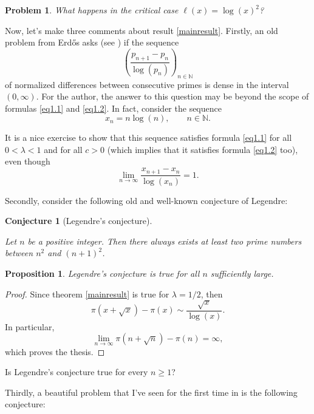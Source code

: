 \documentclass[11pt]{amsart}
\newtheorem{proposition}[theorem]{Proposition}
\newtheorem{conjecture}[theorem]{Conjecture}
\newtheorem{problem}[theorem]{Problem}
\numberwithin{equation}{section}
\newcommand{\N}{\mathbb{N}}
\newcommand{\dilim}{\displaystyle \lim}
\newcommand{\difrac}{\displaystyle \frac}
\begin{document}
\begin{problem}

What happens in the critical case $\ell(x) = \log(x)^2$?

\end{problem}

Now, let's make three comments about result \ref{mainresult}. Firstly, an old problem from Erd\H{o}s asks (see \cite{Erdos2}) if the sequence $$\left(\difrac{p_{n + 1} - p_n}{\log(p_n)}\right)_{n \in \N}$$ of normalized differences between consecutive primes is dense in the interval $(0, \infty)$. For the author, the answer to this question may be beyond the scope of formulas \ref{eq1.1} and \ref{eq1.2}. In fact, consider the sequence $$x_n = n\log(n), \qquad n \in \N.$$

It is a nice exercise to show that this sequence satisfies formula \ref{eq1.1} for all $0 < \lambda < 1$ and for all $c > 0$ (which implies that it satisfies formula \ref{eq1.2} too), even though $$\dilim_{n \to \infty} \difrac{x_{n + 1} - x_n}{\log(x_n)} = 1.$$

Secondly, consider the following old and well-known conjecture of Legendre:

\begin{conjecture}[Legendre's conjecture] \label{legendreconjecture}

Let $n$ be a positive integer. Then there always exists at least two prime numbers between $n^2$ and $(n + 1)^2$. 

\end{conjecture}

\begin{proposition}

Legendre's conjecture is true for all $n$ sufficiently large.

\end{proposition}

\begin{proof} Since theorem \ref{mainresult} is true for $\lambda = 1/2$, then $$\pi(x + \sqrt{x}) - \pi(x) \sim \difrac{\sqrt{x}}{\log(x)}.$$ In particular, $$\dilim_{n \to \infty} \pi(n + \sqrt{n}) - \pi(n) = \infty,$$ which proves the thesis. \end{proof}

Is Legendre's conjecture true for every $n \geq 1$?

Thirdly, a beautiful problem that I've seen for the first time in \cite{Ribenboim} is the following conjecture:
\end{document}
